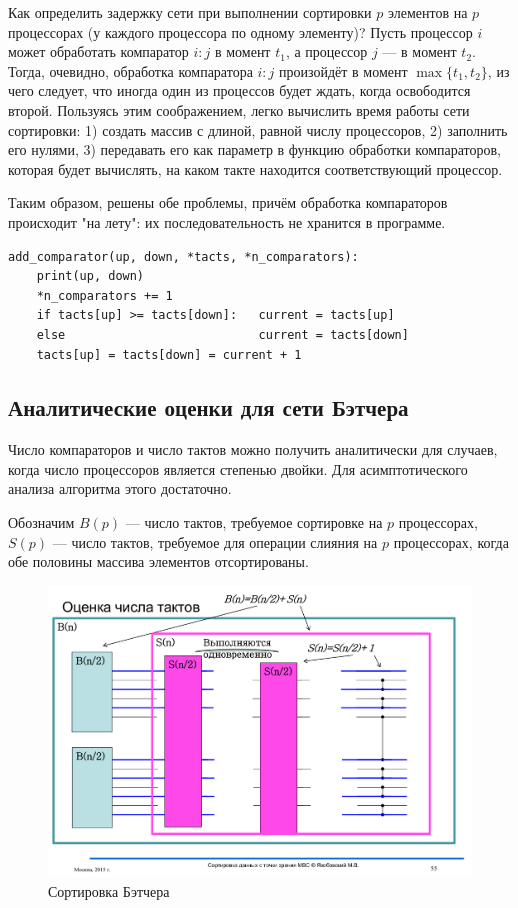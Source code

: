 \documentclass[14pt]{extarticle}
\begin{document}
Как определить задержку сети при выполнении сортировки $p$ элементов на $p$ процессорах (у каждого процессора по одному элементу)? Пусть процессор $i$ может обработать компаратор $i:j$ в момент $t_1$, а процессор $j$ --- в момент $t_2$. Тогда, очевидно, обработка компаратора $i:j$ произойдёт в момент $\max\{t_1, t_2\}$, из чего следует, что иногда один из процессов будет ждать, когда освободится второй. Пользуясь этим соображением, легко вычислить время работы сети сортировки: 1) создать массив с длиной, равной числу процессоров, 2) заполнить его нулями, 3) передавать его как параметр в функцию обработки компараторов, которая будет вычислять, на каком такте находится соответствующий процессор.

Таким образом, решены обе проблемы, причём обработка компараторов происходит "на лету": их последовательность не хранится в программе.
\begin{lstlisting}
add_comparator(up, down, *tacts, *n_comparators):
	print(up, down)
	*n_comparators += 1
	if tacts[up] >= tacts[down]:   current = tacts[up]
	else                           current = tacts[down]
	tacts[up] = tacts[down] = current + 1
\end{lstlisting}


\subsection{Аналитические оценки для сети Бэтчера}
Число компараторов и число тактов можно получить аналитически для случаев, когда число процессоров является степенью двойки. Для асимптотического анализа алгоритма этого достаточно.

Обозначим $B(p)$ --- число тактов, требуемое сортировке на $p$ процессорах, $S(p)$ --- число тактов, требуемое для операции слияния на $p$ процессорах, когда обе половины массива элементов отсортированы.

\begin{figure}[H]
	\centering
	\includegraphics[scale=0.4]{tacts}
	\caption{Сортировка Бэтчера}
\end{figure}
\end{document}

